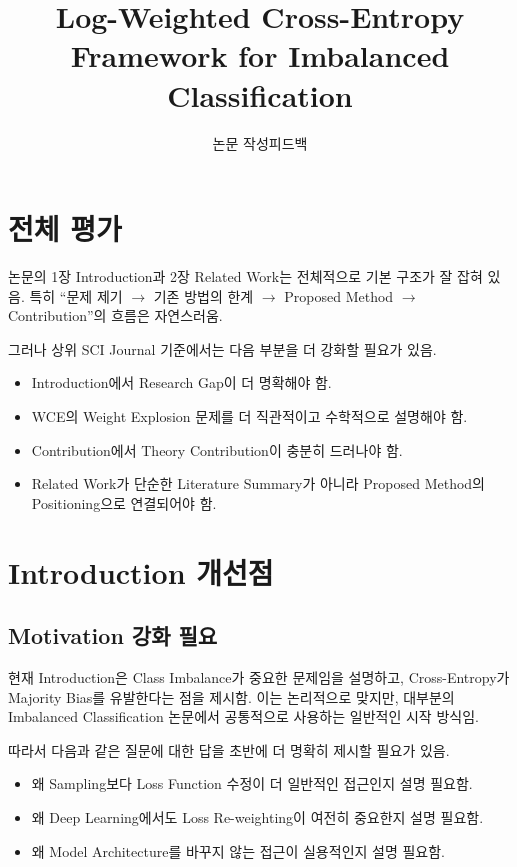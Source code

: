 \documentclass[11pt,a4paper]{article}
\title{\textbf{Log-Weighted Cross-Entropy Framework for Imbalanced Classification}\\
\large }
\author{논문 작성피드백}
\date{}
\begin{document}
\maketitle

\section{전체 평가}

논문의 1장 Introduction과 2장 Related Work는 전체적으로 기본 구조가 잘 잡혀 있음. 특히 ``문제 제기 $\rightarrow$ 기존 방법의 한계 $\rightarrow$ Proposed Method $\rightarrow$ Contribution''의 흐름은 자연스러움.

그러나 상위 SCI Journal 기준에서는 다음 부분을 더 강화할 필요가 있음.

\begin{itemize}
\item Introduction에서 Research Gap이 더 명확해야 함.
\item WCE의 Weight Explosion 문제를 더 직관적이고 수학적으로 설명해야 함.
\item Contribution에서 Theory Contribution이 충분히 드러나야 함.
\item Related Work가 단순한 Literature Summary가 아니라 Proposed Method의 Positioning으로 연결되어야 함.
\end{itemize}

\section{Introduction 개선점}

\subsection{Motivation 강화 필요}

현재 Introduction은 Class Imbalance가 중요한 문제임을 설명하고, Cross-Entropy가 Majority Bias를 유발한다는 점을 제시함. 이는 논리적으로 맞지만, 대부분의 Imbalanced Classification 논문에서 공통적으로 사용하는 일반적인 시작 방식임.

따라서 다음과 같은 질문에 대한 답을 초반에 더 명확히 제시할 필요가 있음.

\begin{itemize}
\item 왜 Sampling보다 Loss Function 수정이 더 일반적인 접근인지 설명 필요함.
\item 왜 Deep Learning에서도 Loss Re-weighting이 여전히 중요한지 설명 필요함.
\item 왜 Model Architecture를 바꾸지 않는 접근이 실용적인지 설명 필요함.
\end{itemize}
\end{document}
